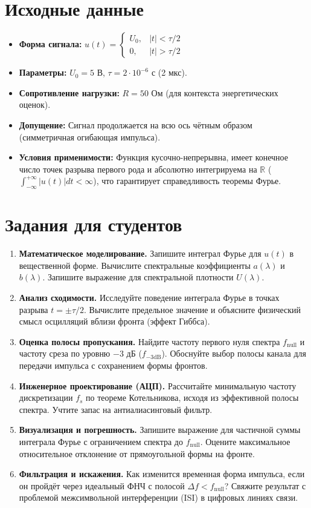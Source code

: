 \documentclass[12pt,a4paper]{article}
\begin{document}
\section{Исходные данные}
\begin{itemize}
    \item \textbf{Форма сигнала:} $u(t) = \begin{cases} U_0, & |t| < \tau/2 \\ 0, & |t| > \tau/2 \end{cases}$
    \item \textbf{Параметры:} $U_0 = 5$ В, $\tau = 2 \cdot 10^{-6}$ с (2 мкс).
    \item \textbf{Сопротивление нагрузки:} $R = 50$ Ом (для контекста энергетических оценок).
    \item \textbf{Допущение:} Сигнал продолжается на всю ось чётным образом (симметричная огибающая импульса).
    \item \textbf{Условия применимости:} Функция кусочно-непрерывна, имеет конечное число точек разрыва первого рода и абсолютно интегрируема на $\mathbb{R}$ ($\int_{-\infty}^{+\infty} |u(t)| dt < \infty$), что гарантирует справедливость теоремы Фурье.
\end{itemize}

\section{Задания для студентов}
\begin{enumerate}
    \item \textbf{Математическое моделирование.} Запишите интеграл Фурье для $u(t)$ в вещественной форме. Вычислите спектральные коэффициенты $a(\lambda)$ и $b(\lambda)$. Запишите выражение для спектральной плотности $U(\lambda)$.
    \item \textbf{Анализ сходимости.} Исследуйте поведение интеграла Фурье в точках разрыва $t = \pm \tau/2$. Вычислите предельное значение и объясните физический смысл осцилляций вблизи фронта (эффект Гиббса).
    \item \textbf{Оценка полосы пропускания.} Найдите частоту первого нуля спектра $f_{\text{null}}$ и частоту среза по уровню $-3$ дБ ($f_{-3\text{dB}}$). Обоснуйте выбор полосы канала для передачи импульса с сохранением формы фронтов.
    \item \textbf{Инженерное проектирование (АЦП).} Рассчитайте минимальную частоту дискретизации $f_s$ по теореме Котельникова, исходя из эффективной полосы спектра. Учтите запас на антиалиасинговый фильтр.
    \item \textbf{Визуализация и погрешность.} Запишите выражение для частичной суммы интеграла Фурье с ограничением спектра до $f_{\text{null}}$. Оцените максимальное относительное отклонение от прямоугольной формы на фронте.
    \item \textbf{Фильтрация и искажения.} Как изменится временная форма импульса, если он пройдёт через идеальный ФНЧ с полосой $\Delta f < f_{\text{null}}$? Свяжите результат с проблемой межсимвольной интерференции (ISI) в цифровых линиях связи.
\end{enumerate}
\end{document}
